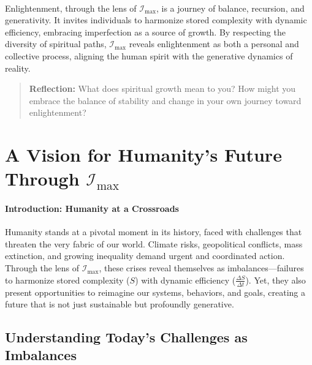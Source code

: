 \documentclass[12pt]{article}
\begin{document}
\paragraph{}
Enlightenment, through the lens of \(\mathcal{I}_{\text{max}}\), is a journey of balance, recursion, and generativity. It invites individuals to harmonize stored complexity with dynamic efficiency, embracing imperfection as a source of growth. By respecting the diversity of spiritual paths, \(\mathcal{I}_{\text{max}}\) reveals enlightenment as both a personal and collective process, aligning the human spirit with the generative dynamics of reality.

\begin{quote}
\textbf{Reflection:}  
What does spiritual growth mean to you? How might you embrace the balance of stability and change in your own journey toward enlightenment?
\end{quote}


\section{A Vision for Humanity’s Future Through \(\mathcal{I}_{\text{max}}\)}

\paragraph{Introduction: Humanity at a Crossroads}
Humanity stands at a pivotal moment in its history, faced with challenges that threaten the very fabric of our world. Climate risks, geopolitical conflicts, mass extinction, and growing inequality demand urgent and coordinated action. Through the lens of \(\mathcal{I}_{\text{max}}\), these crises reveal themselves as imbalances—failures to harmonize stored complexity (\(S\)) with dynamic efficiency (\(\frac{\Delta S}{\Delta t}\)). Yet, they also present opportunities to reimagine our systems, behaviors, and goals, creating a future that is not just sustainable but profoundly generative.

\subsection{Understanding Today’s Challenges as Imbalances}
\end{document}

